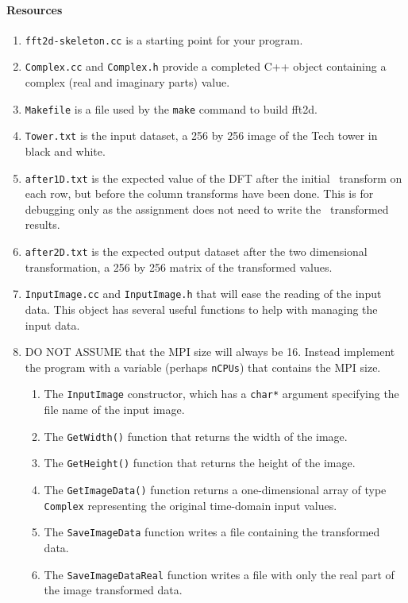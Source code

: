 \documentclass[10pt]{article}
\begin{document}
\paragraph{Resources}
\begin{enumerate}
\item {\tt fft2d-skeleton.cc} is a starting point for your program.
\item {\tt Complex.cc} and {\tt Complex.h} provide a completed C++
object containing a complex (real and imaginary parts) value.
\item {\tt Makefile} is a file used by the {\tt make} command to
build fft2d.
\item {\tt Tower.txt} is the input dataset, a 256 by 256 image of the
Tech tower in black and white.
\item {\tt after1D.txt} is the expected value of the DFT
after the initial \od\ transform on each row, but before the column
transforms have been done. This is for debugging only as the assignment does
not need to write the \od\ transformed results.
\item {\tt after2D.txt} is the expected output dataset after the two dimensional
transformation, 
a 256 by 256 matrix of the transformed values.
\item {\tt InputImage.cc} and {\tt InputImage.h} that will ease the reading
of the input data.  This object has several useful functions to help with
managing the input data.
\item DO NOT ASSUME that the MPI size will always be 16.  Instead implement
the program with a variable (perhaps {\tt nCPUs}) that contains the
MPI size.
\begin{enumerate}
\item The {\tt InputImage} constructor, which has a {\tt char*} argument
specifying the file name of the input image.
\item The {\tt GetWidth()} function that returns the width of the image.
\item The {\tt GetHeight()} function that returns the height of the image.
\item The {\tt GetImageData()} function returns a one-dimensional array
of type {\tt Complex} representing the original time-domain input values.
\item The {\tt SaveImageData} function writes a file containing the
transformed data.
\item The {\tt SaveImageDataReal} function writes a file with only
the real part of the image transformed data.
\end{enumerate}
\end{enumerate}
\end{document}
